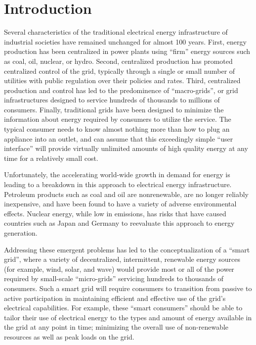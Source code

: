 \section{Introduction}
Several characteristics of the traditional electrical energy infrastructure of industrial societies have remained unchanged for almost 100 years.  First, energy production has been centralized in power plants using ``firm'' energy sources such as coal, oil, nuclear, or hydro.  Second, centralized production has promoted centralized control of the grid, typically through a single or small number of utilities with public regulation over their policies and rates.  Third, centralized production and control has led to the predominence of ``macro-grids'', or grid infrastructures designed to service hundreds of thousands to millions of consumers. Finally, traditional grids have been designed to minimize the information about energy required by consumers to utilize the service.  The typical consumer needs to know almost nothing more than how to plug an appliance into an outlet, and can assume that this exceedingly simple ``user interface'' will provide virtually unlimited amounts of high quality energy at any time for a relatively small cost.

Unfortunately, the accelerating world-wide growth in demand for energy is leading to a breakdown in this approach to electrical energy infrastructure.  Petroleum products such as coal and oil are nonrenewable, are no longer reliably inexpensive, and have been found to have a variety of adverse environmental effects.  Nuclear energy, while low in emissions, has risks that have caused countries such as Japan and Germany to reevaluate this approach to energy generation.

Addressing these emergent problems has led to the conceptualization of a ``smart grid'', where a variety of decentralized, intermittent, renewable energy sources (for example, wind, solar, and wave) would provide most or all of the power required by small-scale ``micro-grids'' servicing hundreds to thousands of consumers. Such a smart grid will require consumers to transition from passive to active participation in maintaining efficient and effective use of the grid's electrical capabilities.  For example, these ``smart consumers'' should be able to tailor their use of electrical energy to the types and amount of energy available in the grid at any point in time; minimizing the overall use of non-renewable resources as well as peak loads on the grid.

